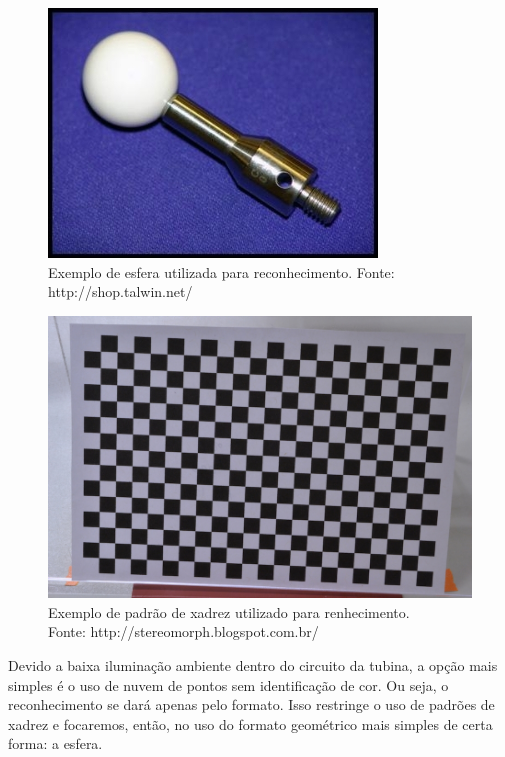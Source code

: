 \begin{figure}[h!]
   \centering
   \includegraphics[width=0.95\columnwidth]{figs/localizacao/sphere_rec}
   \caption{Exemplo de esfera utilizada para reconhecimento. Fonte:
   http://shop.talwin.net/}
   \label{fig::sphere_rec}
\end{figure}



\begin{figure}[h!]
   \centering
   \includegraphics[width=0.95\columnwidth]{figs/localizacao/checkerboard_rec}
   \caption{Exemplo de padrão de xadrez utilizado para renhecimento.\\ Fonte:
   http://stereomorph.blogspot.com.br/}
   \label{fig::checkerboard_rec}
\end{figure}


Devido a baixa iluminação ambiente dentro do circui\-to da tubina, a opção
mais simples é o uso de nu\-vem de pontos sem identificação de cor. Ou seja, o
reconhecimento se dará apenas pelo formato. Isso restringe o uso de padrões de
xadrez e focaremos, então, no uso do formato geométrico mais simples de certa
forma: a esfera.

